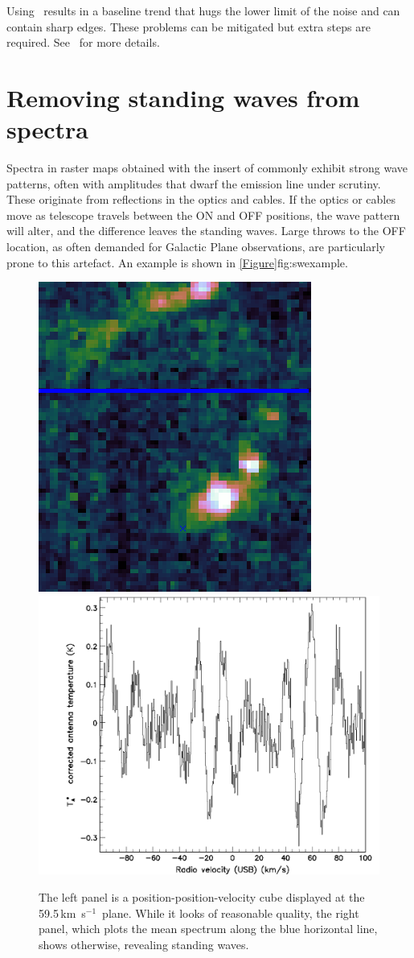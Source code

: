 \documentclass[11pt,oneside,chapters]{starlink}
\newcommand{\kms}{\mbox{$\,$km~s$^{-1}$}}   %
\newcommand{\kms}{\,km~s$^{-1}$}   %
\begin{document}
Using \findback\ results in a baseline trend that hugs the lower limit
of the noise and can contain sharp edges. These problems can be
mitigated but extra steps are required. See \cupidsun\ for more
details.

\section{Removing standing waves from spectra}

Spectra in raster maps obtained with the
 insert of
 commonly exhibit strong wave
patterns, often with amplitudes that dwarf the emission line under
scrutiny.  These originate from reflections in the optics and cables.
If the optics or cables move as telescope travels between the ON and
OFF positions, the wave pattern will alter, and the difference leaves
the standing waves.  Large throws to the OFF location, as often
demanded for Galactic Plane observations, are particularly prone to
this artefact.  An example is shown in
\cref{Figure}{fig:swexample}{}.

\begin{figure}[ht!]
\begin{center}
\includegraphics[align=c,width=0.375\linewidth]{sc20_swimage}
\includegraphics[align=c,width=0.525\linewidth]{sc20_swspectrum}
\caption[A reduced spectral cube with standing waves]
{\label{fig:swexample}
  The left panel is a position-position-velocity cube displayed at
  the 59.5\kms\ plane. While it looks of reasonable quality, the right
  panel, which plots the mean spectrum along the blue horizontal line,
  shows otherwise, revealing standing waves.}
\end{center}
\end{figure}
\end{document}
